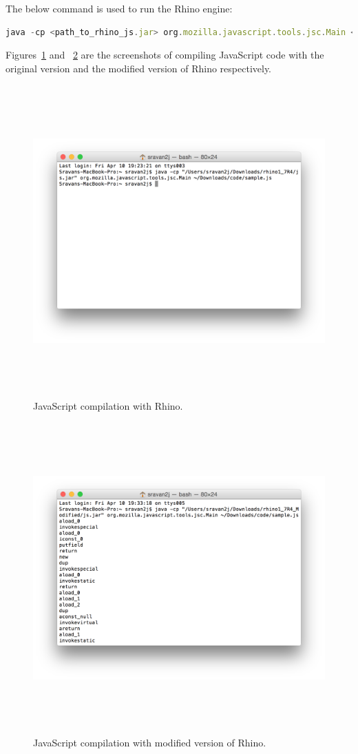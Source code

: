 The below command is used to run the Rhino engine:
\begin{lstlisting}[frame=none,numbers=none,language=JavaScript] 
java -cp <path_to_rhino_js.jar> org.mozilla.javascript.tools.jsc.Main <JavaScript_File_Path>
\end{lstlisting} 
Figures~\ref{fig:codecomprhino} and ~\ref{fig:codecompmodifiedrhino} are the screenshots of compiling JavaScript code with the original version and the modified version of Rhino respectively. 

\begin{figure}
  \centering
      \includegraphics[width=17cm, height=11.95cm]{rhino_screenshot1.png}
    \caption[JavaScript compilation with Rhino]{JavaScript compilation with Rhino.}
    \label{fig:codecomprhino}
\end{figure}

\begin{figure}
  \centering
      \includegraphics[width=17cm, height=11.95cm]{rhino_screenshot2.png}
    \caption[JavaScript compilation with modified version of Rhino]{JavaScript compilation with modified version of Rhino.}
    \label{fig:codecompmodifiedrhino}
\end{figure}